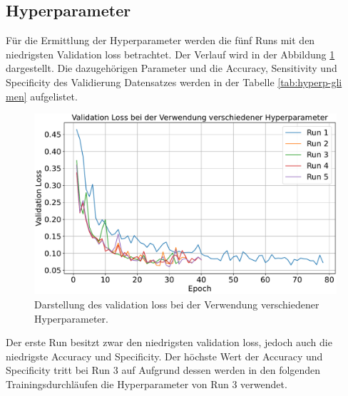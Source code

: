 \subsection{Hyperparameter}
Für die Ermittlung der Hyperparameter werden die fünf Runs mit den niedrigsten Validation loss betrachtet.
Der Verlauf wird in der Abbildung \ref{fig:val_loss gli-men} dargestellt.
Die dazugehörigen Parameter und die Accuracy, Sensitivity und Specificity des Validierung Datensatzes werden in der Tabelle \ref{tab:hyperp-gli men} aufgelistet.
\begin{figure}[H]
  \centering
  \includegraphics[scale=0.3]{plots/Val_loss_Gli_Men.pdf}
  \caption{Darstellung des validation loss bei der Verwendung verschiedener Hyperparameter.}
  \label{fig:val_loss gli-men}
\end{figure}
\begin{table}[H]
    \centering
  \caption{Die fünf Runs mit dem niedrigsten validation loss sowie deren verwendete Hyperparameter und aufgezeichnete Metriken.}
  \label{tab:hyperp-gli men}
\end{table}
Der erste Run besitzt zwar den niedrigsten validation loss, jedoch auch die niedrigste Accuracy und Specificity.
Der höchste Wert der Accuracy und Specificity tritt bei Run 3 auf
Aufgrund dessen werden in den folgenden Trainingsdurchläufen die Hyperparameter von Run 3 verwendet.
